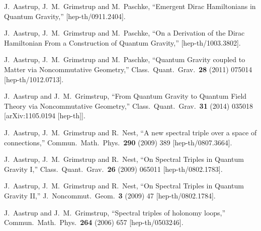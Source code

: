 \documentclass[12pt]{article}
\begin{document}
\begin{thebibliography}{99}
  J.~Aastrup, J.~M.~Grimstrup and M.~Paschke,
  ``Emergent Dirac Hamiltonians in Quantum Gravity,''  
  [hep-th/0911.2404].


  J.~Aastrup, J.~M.~Grimstrup and M.~Paschke,
  ``On a Derivation of the Dirac Hamiltonian From a Construction of Quantum
  Gravity,''
 [hep-th/1003.3802].




  J.~Aastrup, J.~M.~Grimstrup and M.~Paschke,
  ``Quantum Gravity coupled to Matter via Noncommutative Geometry,''
  Class.\ Quant.\ Grav.\  {\bf 28} (2011) 075014
  [hep-th/1012.0713].









  J.~Aastrup and J.~M.~Grimstrup,
  ``From Quantum Gravity to Quantum Field Theory via Noncommutative Geometry,''
  Class.\ Quant.\ Grav.\  {\bf 31} (2014) 035018
  [arXiv:1105.0194 [hep-th]].





  J.~Aastrup, J.~M.~Grimstrup and R.~Nest,
  ``A new spectral triple over a space of connections,''
  Commun.\ Math.\ Phys.\  {\bf 290} (2009) 389
  [hep-th/0807.3664].


  J.~Aastrup, J.~M.~Grimstrup and R.~Nest,
  ``On Spectral Triples in Quantum Gravity I,''
  Class.\ Quant.\ Grav.\  {\bf 26} (2009) 065011
  [hep-th/0802.1783].


  J.~Aastrup, J.~M.~Grimstrup and R.~Nest,
  ``On Spectral Triples in Quantum Gravity II,''
  J.\ Noncommut.\ Geom.\  {\bf 3} (2009) 47
  [hep-th/0802.1784].

  J.~Aastrup and J.~M.~Grimstrup,
  ``Spectral triples of holonomy loops,''
  Commun.\ Math.\ Phys.\  {\bf 264} (2006) 657
  [hep-th/0503246].






\end{thebibliography}
\end{document}
